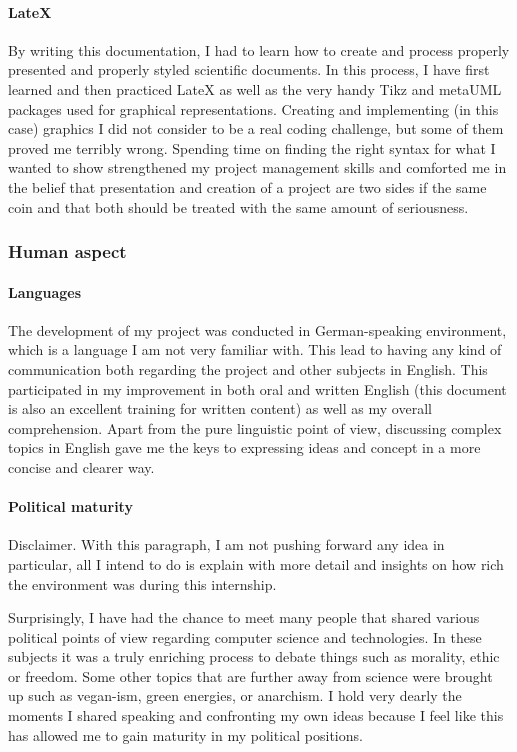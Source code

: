 			 \paragraph{LateX}
By writing this documentation, I had to learn how to create and process properly presented and properly styled scientific documents. In this process, I have first learned and then practiced LateX as well as the very handy Tikz and metaUML packages used for graphical representations.
Creating and implementing (in this case) graphics I did not consider to be a real coding challenge, but some of them proved me terribly wrong. Spending time on finding the right syntax for what I wanted to show strengthened my project management skills and comforted me in the belief that presentation and creation of a project are two sides if the same coin and that both should be treated with the same amount of seriousness.  			  
	

		\subsubsection{Human aspect}
		
			\paragraph{Languages}
The development of my project was conducted in German-speaking environment, which is a language I am not very familiar with. 
This lead to having any kind of communication both regarding the project and other subjects in English. This participated in my improvement in both oral and written English (this document is also an excellent training for written content) as well as my overall comprehension.
Apart from the pure linguistic point of view, discussing complex topics in English gave me the keys to expressing ideas and concept in a more concise and clearer way. 			

			\paragraph{Political maturity}
Disclaimer. With this paragraph, I am not pushing forward any idea in particular, all I intend to do is explain with more detail and insights on how rich the environment was during this internship.			
			
Surprisingly, I have had the chance to meet many people that shared various political points of view regarding computer science and technologies. In these subjects it was a truly enriching process to debate things such as morality, ethic or freedom.
Some other topics that are further away from science were brought up such as vegan-ism, green energies, or anarchism.
I hold very dearly the moments I shared speaking and confronting my own ideas because I feel like this has allowed me to gain maturity in my political positions.		
	
